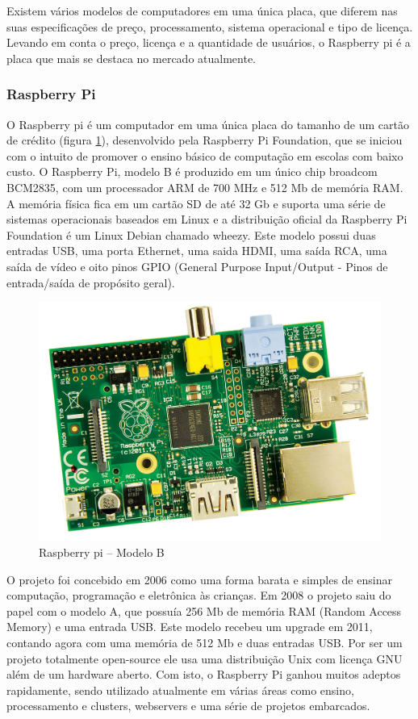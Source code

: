 Existem vários modelos de computadores em uma única placa, que diferem nas suas especificações de preço, processamento, sistema operacional e tipo de licença. Levando em conta o preço, licença e a quantidade de usuários, o Raspberry pi é a placa que mais se destaca no mercado atualmente.

\subsubsection{Raspberry Pi}

O Raspberry pi é um computador em uma única placa do tamanho de um cartão de crédito (figura \ref{fig:raspberry}), desenvolvido pela Raspberry Pi Foundation, que se iniciou com o intuito de promover o ensino básico de computação em escolas com baixo custo. O Raspberry Pi, modelo B é produzido em um único chip broadcom BCM2835, com um processador ARM de 700 MHz e 512 Mb de memória RAM. A memória física fica em um cartão SD de até 32 Gb e suporta uma série de sistemas operacionais baseados em Linux e a distribuição oficial da Raspberry Pi Foundation é um Linux Debian chamado wheezy. Este modelo possui duas entradas USB, uma porta Ethernet, uma saida HDMI, uma saída RCA, uma saída de vídeo e oito pinos GPIO (General Purpose Input/Output - Pinos de entrada/saída de propósito geral).

\begin{figure}[H]
\centering
\includegraphics[width=\textwidth]{Figuras/raspberry}
\caption{Raspberry pi – Modelo B}
\label{fig:raspberry}
\end{figure}

O projeto foi concebido em 2006 como uma forma barata e simples de ensinar computação, programação e eletrônica às crianças. Em 2008 o projeto saiu do papel com o modelo A, que possuía 256 Mb de memória RAM (Random Access Memory) e uma entrada USB. Este modelo recebeu um upgrade em 2011, contando agora com uma memória de 512 Mb e duas entradas USB. Por ser um projeto totalmente open-source ele usa uma distribuição Unix com licença GNU além de um hardware aberto. Com isto, o Raspberry Pi ganhou muitos adeptos rapidamente, sendo utilizado atualmente em várias áreas como ensino, processamento e clusters, webservers e uma série de projetos embarcados.

